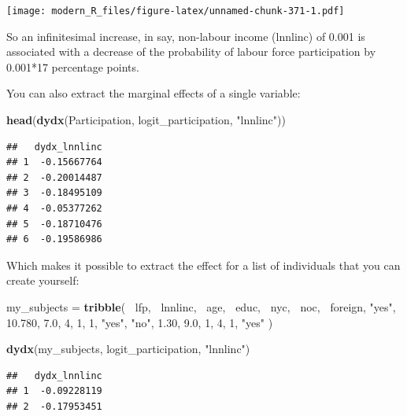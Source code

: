 \documentclass[]{gitbook}
\newenvironment{Shaded}{\begin{snugshade}}{\end{snugshade}}
\newcommand{\DecValTok}[1]{\textcolor[rgb]{0.00,0.00,0.81}{#1}}
\newcommand{\FloatTok}[1]{\textcolor[rgb]{0.00,0.00,0.81}{#1}}
\newcommand{\KeywordTok}[1]{\textcolor[rgb]{0.13,0.29,0.53}{\textbf{#1}}}
\newcommand{\NormalTok}[1]{#1}
\newcommand{\OperatorTok}[1]{\textcolor[rgb]{0.81,0.36,0.00}{\textbf{#1}}}
\newcommand{\StringTok}[1]{\textcolor[rgb]{0.31,0.60,0.02}{#1}}
\theoremstyle{definition}
\theoremstyle{definition}
\theoremstyle{definition}
\theoremstyle{remark}
\begin{document}
\texttt{[image: modern\_R\_files/figure-latex/unnamed-chunk-371-1.pdf]}

So an infinitesimal increase, in say, non-labour income (lnnlinc) of
0.001 is associated with a decrease of the probability of labour force
participation by 0.001*17 percentage points.

You can also extract the marginal effects of a single variable:

\begin{Shaded}
\begin{Highlighting}[]
\KeywordTok{head}\NormalTok{(}\KeywordTok{dydx}\NormalTok{(Participation, logit_participation, }\StringTok{"lnnlinc"}\NormalTok{))}
\end{Highlighting}
\end{Shaded}

\begin{verbatim}
##   dydx_lnnlinc
## 1  -0.15667764
## 2  -0.20014487
## 3  -0.18495109
## 4  -0.05377262
## 5  -0.18710476
## 6  -0.19586986
\end{verbatim}

Which makes it possible to extract the effect for a list of individuals
that you can create yourself:

\begin{Shaded}
\begin{Highlighting}[]
\NormalTok{my_subjects =}\StringTok{ }\KeywordTok{tribble}\NormalTok{(}
    \OperatorTok{~}\NormalTok{lfp,  }\OperatorTok{~}\NormalTok{lnnlinc, }\OperatorTok{~}\NormalTok{age, }\OperatorTok{~}\NormalTok{educ, }\OperatorTok{~}\NormalTok{nyc, }\OperatorTok{~}\NormalTok{noc, }\OperatorTok{~}\NormalTok{foreign,}
    \StringTok{"yes"}\NormalTok{,   }\FloatTok{10.780}\NormalTok{,  }\FloatTok{7.0}\NormalTok{,     }\DecValTok{4}\NormalTok{,    }\DecValTok{1}\NormalTok{,   }\DecValTok{1}\NormalTok{,     }\StringTok{"yes"}\NormalTok{,}
     \StringTok{"no"}\NormalTok{,     }\FloatTok{1.30}\NormalTok{,  }\FloatTok{9.0}\NormalTok{,     }\DecValTok{1}\NormalTok{,    }\DecValTok{4}\NormalTok{,   }\DecValTok{1}\NormalTok{,     }\StringTok{"yes"}
\NormalTok{)}

\KeywordTok{dydx}\NormalTok{(my_subjects, logit_participation, }\StringTok{"lnnlinc"}\NormalTok{)}
\end{Highlighting}
\end{Shaded}

\begin{verbatim}
##   dydx_lnnlinc
## 1  -0.09228119
## 2  -0.17953451
\end{verbatim}
\end{document}
